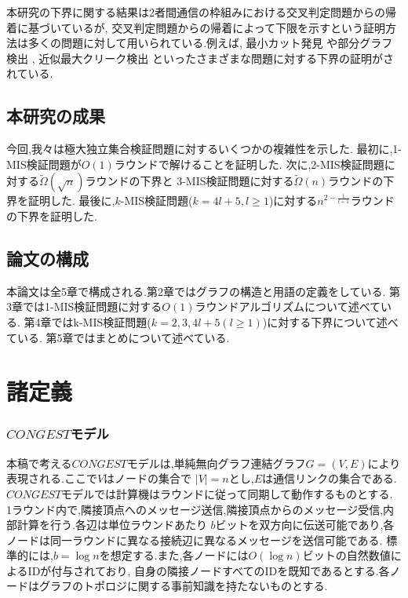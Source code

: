 \documentclass[12]{thesis}
\theoremstyle{definition}
\begin{document}
本研究の下界に関する結果は2者間通信の枠組みにおける交叉判定問題からの帰着に基づいているが,
交叉判定問題からの帰着によって下限を示すという証明方法は多くの問題に対して用いられている.例えば,
最小カット発見 \cite{ghaffari2013distributed} や部分グラフ検出 \cite{fischer2018possibilities} ,
近似最大クリーク検出 \cite{czumaj2020detecting} といったさまざまな問題に対する下界の証明がされている.

\section{本研究の成果}
今回,我々は極大独立集合検証問題に対するいくつかの複雑性を示した.
最初に,1-MIS検証問題が$O(1)$ラウンドで解けることを証明した.
次に,2-MIS検証問題に対する$\tilde{\Omega} (\sqrt{n})$ラウンドの下界と
3-MIS検証問題に対する$\tilde{\Omega} (n)$ラウンドの下界を証明した.
最後に,$k$-MIS検証問題($k = 4l + 5, l \geq 1$)に対する$n^{2 - \frac{1}{l + 1}}$ラウンドの下界を証明した.

\section{論文の構成}
本論文は全5章で構成される.第2章ではグラフの構造と用語の定義をしている.
第3章では1-MIS検証問題に対する$O(1)$ラウンドアルゴリズムについて述べている.
第4章ではk-MIS検証問題($k = 2, 3, 4l + 5( l \geq 1)$)に対する下界について述べている.
第5章ではまとめについて述べている.

\chapter{諸定義}

\subsection*{$CONGEST$モデル}
本稿で考える$CONGEST$モデルは,単純無向グラフ連結グラフ$G = (V, E)$により表現される.ここで$V$はノードの集合で
$|V| = n$とし,$E$は通信リンクの集合である.$CONGEST$モデルでは計算機はラウンドに従って同期して動作するものとする.
1ラウンド内で,隣接頂点へのメッセージ送信,隣接頂点からのメッセージ受信,内部計算を行う.各辺は単位ラウンドあたり
$b$ビットを双方向に伝送可能であり,各ノードは同一ラウンドに異なる接続辺に異なるメッセージを送信可能である.
標準的には,$b = \log n$を想定する.また,各ノードには$O(\log n)$ビットの自然数値によるIDが付与されており,
自身の隣接ノードすべてのIDを既知であるとする.各ノードはグラフのトポロジに関する事前知識を持たないものとする.
\end{document}
